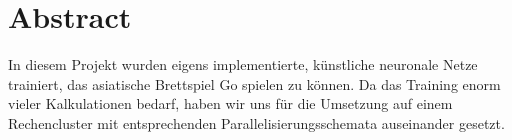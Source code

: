 \section*{Abstract}
In diesem Projekt wurden eigens implementierte, künstliche neuronale Netze
trainiert, das asiatische Brettspiel Go spielen zu können.  Da das Training
enorm vieler Kalkulationen bedarf, haben wir uns für die Umsetzung auf einem
Rechencluster mit entsprechenden Parallelisierungsschemata auseinander gesetzt.
